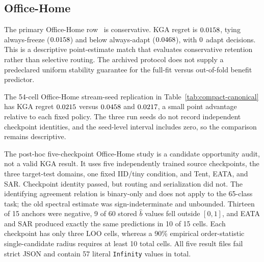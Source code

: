 \subsection{Office-Home}
\label{app:officehome}

The primary Office-Home row~\cite{venkateswara2017officehome} is conservative. KGA regret is $0.0158$, tying always-freeze
($0.0158$) and below always-adapt ($0.0468$), with $0$ adapt decisions. This is a
descriptive point-estimate match that evaluates conservative retention rather than selective
routing. The archived protocol does not supply a predeclared uniform stability guarantee for the
full-fit versus out-of-fold benefit predictor.

The 54-cell Office-Home stream-seed replication in Table~\ref{tab:compact-canonical} has KGA regret
$0.0215$ versus $0.0458$ and $0.0217$, a small point advantage relative to each fixed
policy. The three run seeds do not record independent checkpoint identities, and the seed-level
interval includes zero, so the comparison remains descriptive.

\begin{table}[t]
\centering
\scriptsize
\caption{Office-Home protocols are different experiments, not conflicting versions of one row.
Entries are measured accuracy regret to the per-condition oracle; lower is better. The first row is the
canonical single-candidate KGA replay with fixed SAR. The focused route is invalid, so only the
post-hoc fixed-SAR opportunity regret ($.0027$) and freeze regret ($.0230$) are retained; its actions
have no routing or certificate interpretation. A/F/U are adapt/freeze/abstain actions.}
\label{tab:officehome-reconcile}
\end{table}

The post-hoc five-checkpoint Office-Home study is a candidate opportunity audit, not a valid KGA
result. It uses five independently trained source checkpoints, the three target-test domains, one
fixed IID/tiny condition, and Tent, EATA, and SAR. Checkpoint identity passed, but routing and
serialization did not. The identifying agreement relation is binary-only and does not apply to the
65-class task; the old spectral estimate was sign-indeterminate and unbounded. Thirteen of 15
anchors were negative, 9 of 60 stored $\widehat b$ values fell outside $[0,1]$, and EATA and SAR
produced exactly the same predictions in 10 of 15 cells. Each checkpoint has only three LOO cells,
whereas a 90\% empirical order-statistic single-candidate radius requires at least 10 total cells. All five result
files fail strict JSON and contain 57 literal \texttt{Infinity} values in total.

